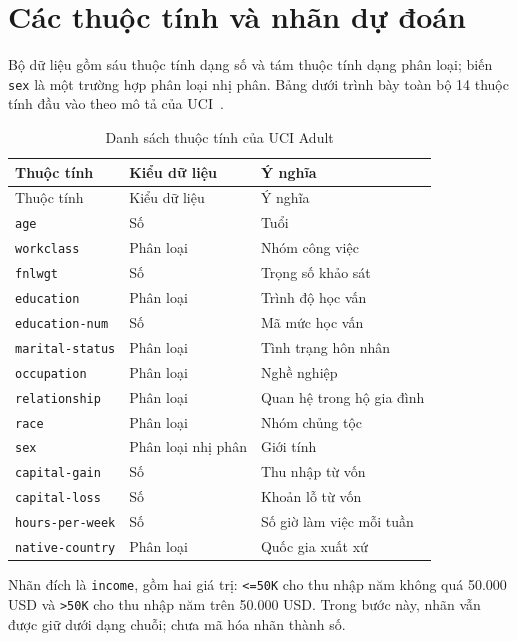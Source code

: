 \section{Các thuộc tính và nhãn dự đoán}
\label{sec:3_2}
Bộ dữ liệu gồm sáu thuộc tính dạng số và tám thuộc tính dạng phân loại; biến \texttt{sex} là một trường hợp phân loại nhị phân. Bảng dưới trình bày toàn bộ 14 thuộc tính đầu vào theo mô tả của UCI~\cite{uci-adult}.

\begin{longtable}{p{}p{}p{}}
\caption{Danh sách thuộc tính của UCI Adult}\label{tab:adult-attributes}\\
\toprule
Thuộc tính & Kiểu dữ liệu & Ý nghĩa \\
\midrule
\endfirsthead
\toprule Thuộc tính & Kiểu dữ liệu & Ý nghĩa \\ \midrule
\endhead
\texttt{age} & Số & Tuổi \\
\texttt{workclass} & Phân loại & Nhóm công việc \\
\texttt{fnlwgt} & Số & Trọng số khảo sát \\
\texttt{education} & Phân loại & Trình độ học vấn \\
\texttt{education-num} & Số & Mã mức học vấn \\
\texttt{marital-status} & Phân loại & Tình trạng hôn nhân \\
\texttt{occupation} & Phân loại & Nghề nghiệp \\
\texttt{relationship} & Phân loại & Quan hệ trong hộ gia đình \\
\texttt{race} & Phân loại & Nhóm chủng tộc \\
\texttt{sex} & Phân loại nhị phân & Giới tính \\
\texttt{capital-gain} & Số & Thu nhập từ vốn \\
\texttt{capital-loss} & Số & Khoản lỗ từ vốn \\
\texttt{hours-per-week} & Số & Số giờ làm việc mỗi tuần \\
\texttt{native-country} & Phân loại & Quốc gia xuất xứ \\
\bottomrule
\end{longtable}

Nhãn đích là \texttt{income}, gồm hai giá trị: \texttt{<=50K} cho thu nhập năm không quá 50.000 USD và \texttt{>50K} cho thu nhập năm trên 50.000 USD. Trong bước này, nhãn vẫn được giữ dưới dạng chuỗi; chưa mã hóa nhãn thành số.
